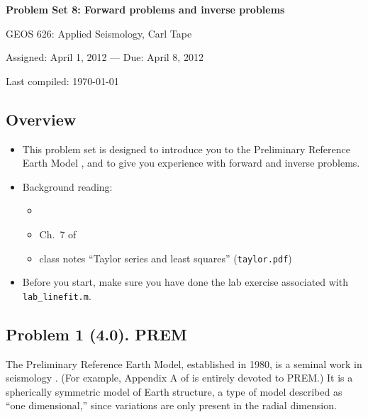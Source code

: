 \documentclass[11pt,titlepage,fleqn]{article}
\begin{document}

\begin{spacing}{1.2}
\begin{center}
{\large \bf Problem Set 8: Forward problems and inverse problems}

GEOS 626: Applied Seismology, Carl Tape

Assigned: April 1, 2012 --- Due: April 8, 2012

Last compiled: \today
\end{center}
\end{spacing}


\subsection*{Overview}

\begin{itemize}
\item This problem set is designed to introduce you to the Preliminary Reference Earth Model \citep{PREM}, and to give you experience with forward and inverse problems.

\item Background reading:
%
\begin{itemize}
\item \citet{PREM}
\item Ch.~7 of \citet{SteinWysession}
\item class notes ``Taylor series and least squares'' (\verb+taylor.pdf+)
\end{itemize}


\item Before you start, make sure you have done the lab exercise associated with \verb+lab_linefit.m+.

\end{itemize}


\subsection*{Problem 1 (4.0). PREM}

The Preliminary Reference Earth Model, established in 1980, is a seminal work in seismology \citep{PREM}. (For example, Appendix A of \citet{ShearerE2} is entirely devoted to PREM.) It is a spherically symmetric model of Earth structure, a type of model described as ``one dimensional,'' since variations are only present in the radial dimension.
\end{document}
